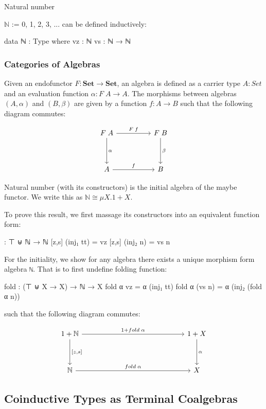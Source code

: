 Natural number {$\mathbb{N}$ := {0, 1, 2, 3, ...} can be defined inductively:

\begin{code}
data ℕ : Type where
  vz : ℕ
  vs : ℕ → ℕ
\end{code}

\subsubsection*{Categories of Algebras}

Given an endofunctor $F : \textbf{Set} \to \textbf{Set}$, an algebra is defined as a carrier type $A : Set$ and an evaluation function $\alpha : F\;A \to A$. The morphisms between algebras $(A,\alpha)$ and $(B,\beta)$ are given by a function $f : A \to B$ such that the following diagram commutes:

\[
\begin{tikzcd}[row sep=huge, column sep=huge]
  F\;A \arrow[r, "F\;f"] \arrow[d, "\alpha"]
  & F\;B \arrow[d, "\beta"] \\
  A \arrow[r, "f"]
  & B
\end{tikzcd}
\]

Natural number (with its constructors) is the initial algebra of the maybe functor. We write this as $\mathbb{N} \cong \mu X. 1 + X$.

To prove this result, we first massage its constructors into an equivalent function form:

\begin{code}
[z,s] : ⊤ ⊎ ℕ → ℕ
[z,s] (inj₁ tt) = vz
[z,s] (inj₂ n) = vs n
\end{code}

For the initiality, we show for any algebra there exists a unique morphism form algebra \texttt{ℕ}. That is to first undefine folding function:

\begin{code}
fold : (⊤ ⊎ X → X) → ℕ → X
fold α vz = α (inj₁ tt)
fold α (vs n) = α (inj₂ (fold α n))
\end{code}

such that the following diagram commutes:

\[
\begin{tikzcd}[row sep=huge, column sep=5cm]
1 + \mathbb{N} \arrow[r, "1 + fold\;\alpha"] \arrow[d, "{[z,s]}"]
& 1 + X \arrow[d, "\alpha"] \\
\mathbb{N} \arrow[r, "fold\;\alpha"]
& X
\end{tikzcd}
\]


\subsection{Coinductive Types as Terminal Coalgebras}

}
